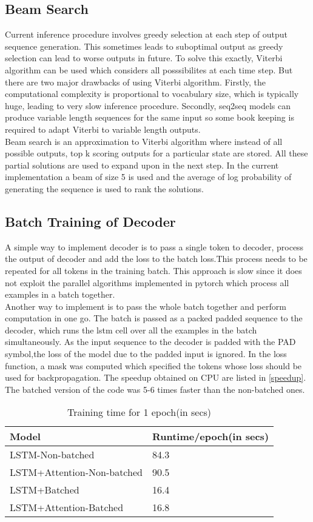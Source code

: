 \documentclass[11pt,a4paper]{article}
\begin{document}
\subsection{Beam Search}
Current inference procedure involves greedy selection at each step of output sequence generation. This sometimes leads to suboptimal output as greedy selection can lead to worse outputs in future. To solve this exactly, Viterbi algorithm can be used which considers all posssibilites at each time step. But there are two major drawbacks of using Viterbi algorithm. Firstly, the computational complexity is proportional to vocabulary size, which is typically huge, leading to very slow inference procedure. Secondly, seq2seq models can produce variable length sequences for the same input so some book keeping is required to adapt Viterbi to variable length outputs.\\
Beam search is an approximation to Viterbi algorithm where instead of all possible outputs, top k scoring outputs for a particular state are stored. All these partial solutions are used to expand upon in the next step. In the current implementation a beam of size 5 is used and the average of log probability of generating the sequence is used to rank the solutions.


\subsection{Batch Training of Decoder}
A simple way to implement decoder is to pass a single token to decoder, process the output of decoder and add the loss to the batch loss.This process needs to be repeated for all tokens in the training batch. This approach is slow since it does not exploit the parallel algorithms implemented in pytorch which process all examples in a batch together. \\
Another way to implement is to pass the whole batch together and perform computation in one go. The batch is passed as a packed padded sequence to the decoder, which runs the lstm cell over all the examples in the batch simultaneously. As the input sequence to the decoder is padded with the PAD symbol,the loss of the model due to the padded input is ignored. In the loss function, a mask was computed which specified the tokens whose loss should be used for backpropagation. The speedup obtained on CPU are listed in \autoref{speedup}. The batched version of the code was 5-6 times faster than the non-batched ones.
\begin{table}[t!]
\begin{center}
\begin{tabularx}{\columnwidth}{|X|X|}
\hline \textbf{Model} & \textbf{Runtime/epoch(in secs)} \\ 
\hline
LSTM-Non-batched  & 84.3\\
LSTM+Attention-Non-batched & 90.5  \\
LSTM+Batched & 16.4\\
LSTM+Attention-Batched & 16.8 \\
\hline
\end{tabularx}
\end{center}
\caption{\label{speedup} Training time for 1 epoch(in secs)}
\end{table}
\end{document}
